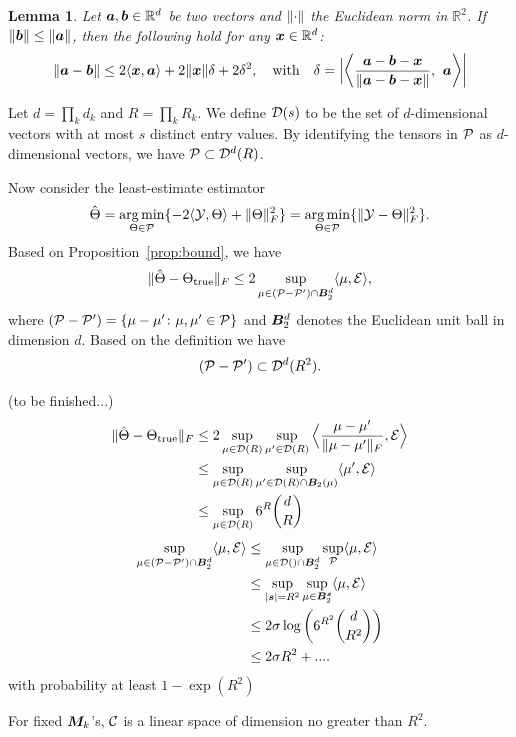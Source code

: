 \documentclass{article}
\newtheorem{lemma}{Lemma}
\begin{document}
\begin{appendices}
\begin{lemma} Let $\bm{a}, \bm{b}\in\mathbb{R}^d$ be two vectors and $\lVert\cdot\rVert$ the Euclidean norm in $\mathbb{R}^2$. If $\lVert\bm{b}\rVert\leq \lVert\bm{a}\rVert$, then the following hold for any $\bm x\in\mathbb{R}^d$:
\[
\normSize{}{\ma-\mb}\leq 2 \langle \mx,\ma\rangle  + 2\normSize{}{\mx}\delta+2\delta^2,\quad \text{with}\quad \delta=\Big|\large \Big\langle{\ma-\mb-\mx\over\normSize{}{\ma-\mb-\mx}},\ \ma \Big\rangle\Big|
\]
\end{lemma}
Let $d=\prod_k d_k$ and $R=\prod_k R_k$. We define $\mathcal{D}(s)$ to be the set of $d$-dimensional vectors with at most $s$ distinct entry values. 
By identifying the tensors in $\mathcal{P}$ as $d$-dimensional vectors, we have $\mathcal{P}\subset \mathcal{D}^d(R)$.


Now consider the least-estimate estimator
\[
\hat \Theta=\operatorname*{arg\,min}_{\Theta\in\mathcal{P}}\{-2\langle \mathcal{Y}, \Theta\rangle+\lVert\Theta\rVert_F^2 \}=\operatorname*{arg\,min}_{\Theta\in\mathcal{P}}\{\lVert\mathcal{Y}-\Theta\rVert_F^2 \}.
\]
Based on Proposition~\ref{prop:bound}, we have
\[
\lVert\hat \Theta-\Theta_{\text{true}}\rVert_F \leq 2\sup_{\mu\in (\mathcal{P}-\mathcal{P}') \cap \bm B^d_2}\langle \mu ,\mathcal{E}\rangle,
\]
where $(\mathcal{P}-\mathcal{P}')=\{\mu-\mu'\colon \mu, \mu'\in\mathcal{P}\}$ and $\bm B^{d}_2$ denotes the Euclidean unit ball in dimension $d$. Based on the definition we have
\[
(\mathcal{P}-\mathcal{P}')\subset \mathcal{D}^d(R^2).
\]

(to be finished...)
\begin{align}
\lVert\hat \Theta-\Theta_{\text{true}}\rVert_F&\leq 2\sup_{\mu\in\mathcal{D}(R)} \sup_{\mu'\in \mathcal{D}(R)} \Big\langle {\mu-\mu'\over \lVert\mu-\mu'\rVert_F}, \mathcal{E} \Big\rangle\\
&\leq \sup_{\mu\in \mathcal{D}(R)}\sup_{\mu'\in \mathcal{D}(R)\cap \bm B_2(\mu)}\langle \mu', \mathcal{E}  \rangle\\
&\leq \sup_{\mu \in \mathcal{D}(R)} 6^R{d \choose R}
\end{align}
\begin{align}
\sup_{\mu\in (\mathcal{P}-\mathcal{P}')\cap \bm B^d_2}\langle \mu ,\mathcal{E}\rangle&\leq \sup_{\mu\in \mathcal{D}()\cap\bm B^d_2}\sup_{\mathcal{P}} \langle \mu, \mathcal{E}\rangle\\
&\leq \sup_{|\bm{s}|= R^2}\sup_{\mu\in\bm B_2^{\bm{s}}}\langle \mu, \mathcal{E}\rangle\\
&\leq2\sigma \log\left(6^{R^2}{d \choose R^2}\right)\\
&\leq 2\sigma R^2+....
\end{align}
with probability at least $1-\exp(R^2)$

For fixed $\bm M_k$'s, $\mathcal{C}$ is a linear space of dimension no greater than $R^2$. 


\end{appendices}
\end{document}
